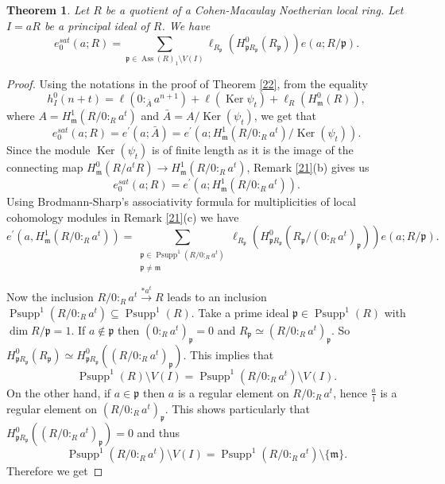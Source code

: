 \documentclass{amsart}
\newtheorem{theorem}{Theorem}[section]
\theoremstyle {definition}
\theoremstyle {remark}
\begin{document}
\begin{theorem}\label{24}
Let $R$ be a quotient of a Cohen-Macaulay Noetherian local ring. Let $I=aR$ be a principal ideal of $R$. We have
$$e^{sat}_0(a; R)=\sum_{{\ensuremath{\mathfrak p}}\in{\operatorname{Ass}}(R)_1\setminus V(I)}\ell_{R_{\ensuremath{\mathfrak p}}}(H^0_{{\ensuremath{\mathfrak p}} R_{\ensuremath{\mathfrak p}}}(R_{\ensuremath{\mathfrak p}}))e(a; R/{\ensuremath{\mathfrak p}}).$$
\end{theorem}
\begin{proof}
Using the notations in the proof of Theorem \ref{22}, from the equality
$$h^0_I(n+t)=\ell(0:_{\bar A}a^{n+1})+\ell({\operatorname{Ker}} \psi_t)+\ell_R(H^0_{\ensuremath{\mathfrak m}}(R)),$$
where $A=H^1_{\ensuremath{\mathfrak m}}(R/0:_Ra^t)$ and $\bar A=A/{\operatorname{Ker}}(\psi_t)$, we get that $$e^{sat}_0(a; R)=e^\prime (a; \bar A)=e^\prime(a; H^1_{\ensuremath{\mathfrak m}}(R/0:_Ra^t)/{\operatorname{Ker}}(\psi_t)).$$
Since the module ${\operatorname{Ker}}(\psi_t)$ is of finite length as it is the image of the connecting map $H^0_{\ensuremath{\mathfrak m}}(R/a^tR)\rightarrow H^1_{\ensuremath{\mathfrak m}}(R/0:_Ra^t)$, Remark \ref{21}(b) gives us
$$e^{sat}_0(a; R)=e^\prime (a; H_{\ensuremath{\mathfrak m}} ^1(R/0:_Ra^t)).$$
Using Brodmann-Sharp's associativity formula for multiplicities of local cohomology modules in Remark \ref{21}(c) we have
\begin{displaymath}
e^\prime (a, H_{\ensuremath{\mathfrak m}} ^1(R/0:_Ra^t))=
\sum_{\substack{{\ensuremath{\mathfrak p}} \in {\operatorname{Psupp}}^1(R/0:_Ra^t) \\ {\ensuremath{\mathfrak p}} \not={\ensuremath{\mathfrak m}}}}
\ell_{R_{\ensuremath{\mathfrak p}} }(H_{{\ensuremath{\mathfrak p}} R_{\ensuremath{\mathfrak p}} }^0(R_{\ensuremath{\mathfrak p}}/(0:_Ra^t)_{\ensuremath{\mathfrak p}}))e(a; R/{\ensuremath{\mathfrak p}} ).
\end{displaymath}

Now the inclusion $R/0:_Ra^t\stackrel{*a^t}{\longrightarrow} R$ leads to an inclusion
${\operatorname{Psupp}}^1(R/0:_Ra^t)\subseteq {\operatorname{Psupp}}^1(R)$. Take a prime ideal ${\ensuremath{\mathfrak p}} \in {\operatorname{Psupp}}^1(R)$ with $\dim R/{\ensuremath{\mathfrak p}} =1$. If $a\not\in{\ensuremath{\mathfrak p}}$ then $(0:_Ra^t)_{\ensuremath{\mathfrak p}}=0$ and $R_{\ensuremath{\mathfrak p}}\simeq (R/0:_Ra^t)_{\ensuremath{\mathfrak p}}$. So $H_{{\ensuremath{\mathfrak p}} R_{\ensuremath{\mathfrak p}} }^0(R_{\ensuremath{\mathfrak p}})\simeq H_{{\ensuremath{\mathfrak p}} R_{\ensuremath{\mathfrak p}} }^0((R/0:_Ra^t)_{\ensuremath{\mathfrak p}})$. This implies that
$${\operatorname{Psupp}}^1(R)\setminus V(I)={\operatorname{Psupp}}^1(R/0:_Ra^t)\setminus V(I).$$
On the other hand, if $a\in {\ensuremath{\mathfrak p}}$ then $a$ is a regular element on $R/0:_Ra^t$, hence $\frac{a}{1}$ is a regular element on $(R/0:_Ra^t)_{\ensuremath{\mathfrak p}}$. This shows particularly that $H_{{\ensuremath{\mathfrak p}} R_{\ensuremath{\mathfrak p}} }^0((R/0:_Ra^t)_{\ensuremath{\mathfrak p}})=0$ and thus
$${\operatorname{Psupp}}^1(R/0:_Ra^t)\setminus V(I)={\operatorname{Psupp}}^1(R/0:_Ra^t)\setminus \{{\ensuremath{\mathfrak m}}\}.$$
Therefore we get


\end{proof}
\end{document}
